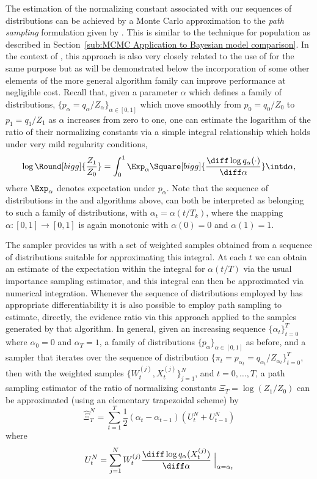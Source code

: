 The estimation of the normalizing constant associated with our sequences of
distributions can be achieved by a Monte Carlo approximation to the \emph{path
  sampling} formulation given by \cite{Gelman:1998ei}. This is similar to the
technique for population \mcmc as described in Section~\ref{sub:MCMC
  Application to Bayesian model comparison}. In the context of \smc, this
approach is also very closely related to the use of \ais for the same purpose
\cite{Neal:2001we} but as will be demonstrated below the incorporation of some
other elements of the more general \smc algorithm family can improve
performance at negligible cost. Recall that, given a parameter $\alpha$ which
defines a family of distributions, $\{p_{\alpha} = q_{\alpha} /
Z_\alpha\}_{\alpha \in [0,1]}$ which move smoothly from $p_0 = q_0 / Z_0$ to
$p_1 = q_1 / Z_1$ as $\alpha$ increases from zero to one, one can estimate the
logarithm of the ratio of their normalizing constants via a simple integral
relationship which holds under very mild regularity conditions,
\begin{equation}
  \log\Round[bigg]{\frac{Z_1}{Z_0}} =
  \int_{0}^{1} \Exp_\alpha \Square[bigg]{
  \frac{\diff\log q_{\alpha}(\cdot)}{\diff\alpha}
  } \intd\alpha, \label{eq:path_identity}
\end{equation}
where $\Exp_\alpha$ denotes expectation under $p_\alpha$. Note that the
sequence of distributions in the \smc[2] and \smc[3] algorithms above, can both be
interpreted as belonging to such a family of distributions, with $\alpha_t =
\alpha(t/T_k)$, where the mapping $\alpha:[0,1]\to[0,1]$ is again monotonic
with $\alpha(0) = 0$ and $\alpha(1) = 1$.

The \smc sampler provides us with a set of weighted samples obtained from a
sequence of distributions suitable for approximating this integral. At each
$t$ we can obtain an estimate of the expectation within the integral for
$\alpha(t/T)$ via the usual importance sampling estimator, and this integral
can then be approximated via numerical integration. Whenever the sequence
of distributions employed by \smc[3] has appropriate differentiability it is
also possible to employ path sampling to estimate, directly, the evidence
ratio via this approach applied to the samples generated by that algorithm. In
general, given an increasing sequence $\{\alpha_t\}_{t=0}^T$ where $\alpha_0 =
0$ and $\alpha_T = 1$, a family of distributions
$\{p_{\alpha}\}_{\alpha\in[0,1]}$ as before, and a \smc sampler that iterates
over the sequence of distribution $\{\pi_t = p_{\alpha_t} =
q_{\alpha_t}/Z_{\alpha_t}\}_{t=0}^T$, then with the weighted samples
$\{W_t^{(j)},X_t^{(j)}\}_{j=1}^N$, and $t = 0,\dots,T$, a path sampling
estimator of the ratio of normalizing constants $\Xi_T = \log(Z_1/Z_0)$
can be approximated (using an elementary trapezoidal scheme) by
\begin{equation}
  \hat\Xi_{T}^{N} = \sum_{t=1}^T
  \frac{1}{2}(\alpha_t - \alpha_{t - 1})(U_t^N + U_{t-1}^N)
  \label{eq:path_est}
\end{equation}
where
\begin{equation}
  U_t^N = \sum_{j=1}^N
  W_t^{(j)} \frac{\diff\log q_{\alpha}(X_t^{(j)})}{\diff\alpha}
  \Bigm|_{\alpha = \alpha_t}
\end{equation}

